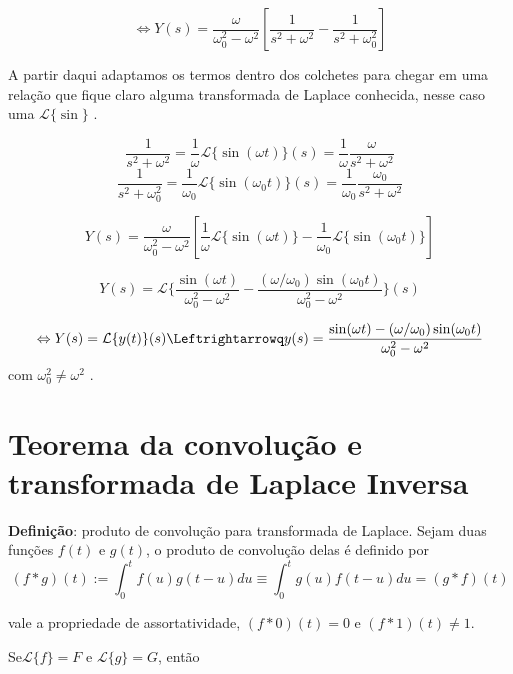     \[ \Leftrightarrow  Y(s) = \frac{\omega}{\omega_0^2 - \omega^2} {\left[ \frac{1}{s^2 + \omega^2} - \frac{1}{s^2 +
            \omega_0^2} \right]}\]                                                                      

    A partir daqui adaptamos os termos dentro dos colchetes para chegar em uma relação que fique
    claro alguma transformada de Laplace conhecida, nesse caso uma \( \mathcal{L} \{\sin\}  \) .

    \[ \frac{1}{s^2 + \omega^2} = \frac{1}{\omega} \mathcal{L} \{\sin(\omega t)\} (s) = \frac{1}{\omega} \frac{\omega}{s^2 + \omega^2} \]
    \[ \frac{1}{s^2 + \omega_0^2} = \frac{1}{\omega_0} \mathcal{L} \{\sin(\omega_0 t)\} (s) = \frac{1}{\omega_0}\frac{\omega_0}{s^2 + \omega^2} \]


    \[ Y(s) = \frac{\omega}{\omega_0^2 - \omega^2} \left[ \frac{1}{\omega} \mathcal{L} \{\sin(\omega t) \} - \frac{1}{\omega_0} \mathcal{L} \{\sin(\omega_0
        t)\}  \right] \]


    \[ Y(s) = \mathcal{L} \bigg\{ \frac{\sin(\omega t)}{\omega_0^2 - \omega^2}  - \frac{(\omega / \omega_0) \sin(\omega_0 t)}{\omega_0^2 - \omega^2}\bigg\}(s)  \]

    \[ \Leftrightarrow Y(s) = \mathcal{L} \{y(t)\} (s) \Leftrightarrowq y(s) = \frac{\sin(\omega t) - (\omega/\omega_0) \sin(\omega_0 t)}{\omega_0^2
        - \omega^2} \]
    com \( \omega_0^2 \neq \omega^2 \) .

\section{Teorema da convolução e transformada de Laplace Inversa}


\begin{theorem}
  \textbf{Definição}: produto de convolução para transformada de Laplace.
  Sejam duas funções \( f(t) \) e \( g(t) \), o produto de convolução delas é definido por
  \begin{equation}
    \left( f * g \right)(t) := \int_{0}^{t} f(u) g(t-u) du \equiv \int_{0}^{t} g(u) f(t-u)du = \left( g * f
    \right) (t)
  \end{equation}
\end{theorem}

vale a propriedade de assortatividade,  \( \left( f * 0 \right)(t) = 0 \)  e \(  \left( f * 1
\right)(t) \neq 1 \).


Se\( \mathcal{L} \{f\}  = F \)  e \( \mathcal{L} \{g\}  = G \), então

